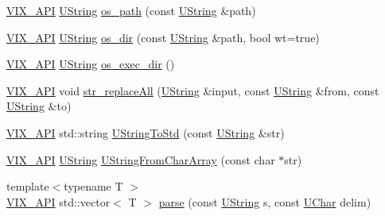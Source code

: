 \begin{DoxyCompactItemize}
\item 
\hyperlink{vix__platform_8h_afdaa33aa7411dace34f16eb161ffaf35}{V\+I\+X\+\_\+\+A\+P\+I} \hyperlink{vix__stringutil_8h_a561c282c415a5c38fd9a26325701e3bf}{U\+String} \hyperlink{namespaceVixen_a5cea209f095e563191139e04fb84fa5d}{os\+\_\+path} (const \hyperlink{vix__stringutil_8h_a561c282c415a5c38fd9a26325701e3bf}{U\+String} \&path)
\item 
\hyperlink{vix__platform_8h_afdaa33aa7411dace34f16eb161ffaf35}{V\+I\+X\+\_\+\+A\+P\+I} \hyperlink{vix__stringutil_8h_a561c282c415a5c38fd9a26325701e3bf}{U\+String} \hyperlink{namespaceVixen_a1436c4df827d9ba7144c01232062a154}{os\+\_\+dir} (const \hyperlink{vix__stringutil_8h_a561c282c415a5c38fd9a26325701e3bf}{U\+String} \&path, bool wt=true)
\item 
\hyperlink{vix__platform_8h_afdaa33aa7411dace34f16eb161ffaf35}{V\+I\+X\+\_\+\+A\+P\+I} \hyperlink{vix__stringutil_8h_a561c282c415a5c38fd9a26325701e3bf}{U\+String} \hyperlink{namespaceVixen_a085bab7fcc31cfe3a319d50ac77fa3d2}{os\+\_\+exec\+\_\+dir} ()
\item 
\hyperlink{vix__platform_8h_afdaa33aa7411dace34f16eb161ffaf35}{V\+I\+X\+\_\+\+A\+P\+I} void \hyperlink{namespaceVixen_a8fab89425ce5e860158a1c8b0f830f12}{str\+\_\+replace\+All} (\hyperlink{vix__stringutil_8h_a561c282c415a5c38fd9a26325701e3bf}{U\+String} \&input, const \hyperlink{vix__stringutil_8h_a561c282c415a5c38fd9a26325701e3bf}{U\+String} \&from, const \hyperlink{vix__stringutil_8h_a561c282c415a5c38fd9a26325701e3bf}{U\+String} \&to)
\item 
\hyperlink{vix__platform_8h_afdaa33aa7411dace34f16eb161ffaf35}{V\+I\+X\+\_\+\+A\+P\+I} std\+::string \hyperlink{namespaceVixen_a6088f3b08203805710aa3a4c729473e3}{U\+String\+To\+Std} (const \hyperlink{vix__stringutil_8h_a561c282c415a5c38fd9a26325701e3bf}{U\+String} \&str)
\item 
\hyperlink{vix__platform_8h_afdaa33aa7411dace34f16eb161ffaf35}{V\+I\+X\+\_\+\+A\+P\+I} \hyperlink{vix__stringutil_8h_a561c282c415a5c38fd9a26325701e3bf}{U\+String} \hyperlink{namespaceVixen_af128e4c5b3178378f4a0147a167633aa}{U\+String\+From\+Char\+Array} (const char $\ast$str)
\item 
{\footnotesize template$<$typename T $>$ }\\\hyperlink{vix__platform_8h_afdaa33aa7411dace34f16eb161ffaf35}{V\+I\+X\+\_\+\+A\+P\+I} std\+::vector$<$ T $>$ \hyperlink{namespaceVixen_a92e7b6218f75ee5ac1ef34896daefea7}{parse} (const \hyperlink{vix__stringutil_8h_a561c282c415a5c38fd9a26325701e3bf}{U\+String} s, const \hyperlink{vix__stringutil_8h_adc2ae6d46e5cd3718f5446c8d2a2c5ac}{U\+Char} delim)
\end{DoxyCompactItemize}


